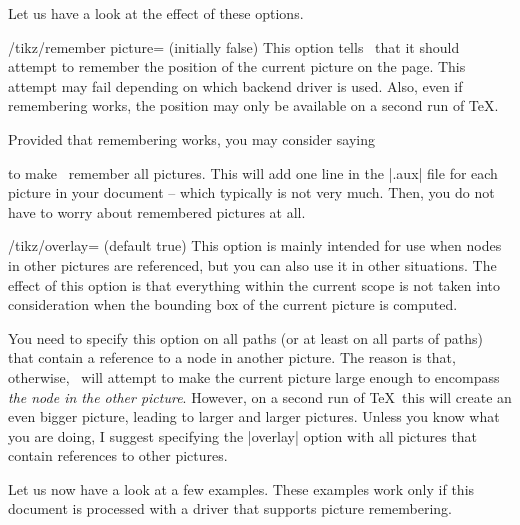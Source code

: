 Let us have a look at the effect of these options.
%
\begin{key}{/tikz/remember picture= (initially false)}
    This option tells \tikzname\ that it should attempt to remember the
    position of the current picture on the page. This attempt may fail
    depending on which backend driver is used. Also, even if remembering works,
    the position may only be available on a second run of \TeX.

    Provided that remembering works, you may consider saying
\begin{codeexample}
\end{codeexample}
    to make \tikzname\ remember all pictures. This will add one line in the
    |.aux| file for each picture in your document -- which typically is not
    very much. Then, you do not have to worry about remembered pictures at all.
\end{key}

\begin{key}{/tikz/overlay= (default true)}
    This option is mainly intended for use when nodes in other pictures are
    referenced, but you can also use it in other situations. The effect of this
    option is that everything within the current scope is not taken into
    consideration when the bounding box of the current picture is computed.

    You need to specify this option on all paths (or at least on all parts of
    paths) that contain a reference to a node in another picture. The reason is
    that, otherwise, \tikzname\ will attempt to make the current picture large
    enough to encompass \emph{the node in the other picture}. However, on a
    second run of \TeX\ this will create an even bigger picture, leading to
    larger and larger pictures. Unless you know what you are doing, I suggest
    specifying the |overlay| option with all pictures that contain references
    to other pictures.
\end{key}

Let us now have a look at a few examples. These examples work only if this
document is processed with a driver that supports picture remembering.
\medskip

